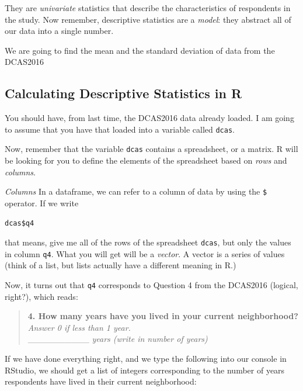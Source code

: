 \documentclass[]{article}
\newenvironment{Shaded}{\begin{snugshade}}{\end{snugshade}}
\newcommand{\NormalTok}[1]{{#1}}
\begin{document}
They are \emph{univariate} statistics that describe the characteristics
of respondents in the study. Now remember, descriptive statistics are a
\emph{model}: they abstract all of our data into a single number.

We are going to find the mean and the standard deviation of data from
the DCAS2016

\subsection{Calculating Descriptive Statistics in
R}\label{calculating-descriptive-statistics-in-r}

You should have, from last time, the DCAS2016 data already loaded. I am
going to assume that you have that loaded into a variable called
\texttt{dcas}.

Now, remember that the variable \texttt{dcas} contains a spreadsheet, or
a matrix. R will be looking for you to define the elements of the
spreadsheet based on \emph{rows} and \emph{columns}.

\emph{Columns} In a dataframe, we can refer to a column of data by using
the \texttt{\$} operator. If we write

\begin{verbatim}
dcas$q4
\end{verbatim}

that means, give me all of the rows of the spreadsheet {\texttt{dcas}},
but only the values in column {\texttt{q4}}. What you will get will be a
\emph{vector}. A vector is a series of values (think of a list, but
lists actually have a different meaning in R.)

Now, it turns out that \texttt{q4} corresponds to Question 4 from the
DCAS2016 (logical, right?), which reads:

\begin{quote}
\textbf{4. How many years have you lived in your current neighborhood?}
\emph{Answer 0 if less than 1 year.}\\
\_\_\_\_\_\_\_\_\_\_ \emph{years (write in number of years)}
\end{quote}

If we have done everything right, and we type the following into our
console in RStudio, we should get a list of integers corresponding to
the number of years respondents have lived in their current
neighborhood:

\begin{Shaded}
\end{Shaded}
\end{document}
